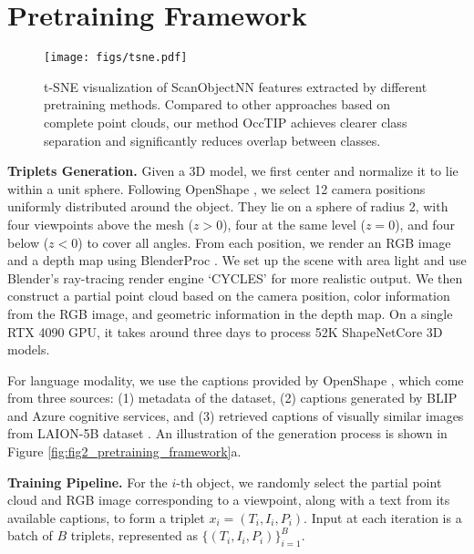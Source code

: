 \section{Pretraining Framework}
\label{sec:occtip}
\begin{figure*}[t]
    \centering
    \texttt{[image: figs/tsne.pdf]}
    \vspace{-7mm}
    \caption{t-SNE visualization of ScanObjectNN \cite{scanobjectnn} features extracted by different pretraining methods. Compared to other approaches based on complete point clouds, our method OccTIP achieves clearer class separation and significantly reduces overlap between classes.}
    \label{fig:tsne}
    \vspace{-5mm}
\end{figure*}
\vspace{1mm} \noindent\textbf{Triplets Generation.}
Given a 3D model, we first center and normalize it to lie within a unit sphere. Following OpenShape \cite{openshape}, we select 12 camera positions uniformly distributed around the object. They lie on a sphere of radius 2, with four viewpoints above the mesh ($z > 0$), four at the same level ($z = 0$), and four below ($z < 0$) to cover all angles. From each position, we render an RGB image and a depth map using BlenderProc \cite{blenderproc}. We set up the scene with area light and use Blender's ray-tracing render engine `CYCLES' for more realistic output. We then construct a partial point cloud based on the camera position, color information from the RGB image, and geometric information in the depth map. On a single RTX 4090 GPU, it takes around three days to process 52K ShapeNetCore \cite{shapenet} 3D models.

For language modality, we use the captions provided by OpenShape \cite{openshape}, which come from three sources: (1) metadata of the dataset, (2) captions generated by BLIP \cite{blip} and Azure cognitive services, and (3) retrieved captions of visually similar images from LAION-5B dataset \cite{laion_5b}. An illustration of the generation process is shown in Figure \ref{fig:fig2_pretraining_framework}a.

\vspace{1mm} 
\noindent\textbf{Training Pipeline.}
For the $i$-th object, we randomly select the partial point cloud and RGB image corresponding to a viewpoint, along with a text from its available captions, to form a triplet $x_i = (T_i, I_i, P_i)$. Input at each iteration is a batch of $B$ triplets, represented as $\{(T_i, I_i, P_i)\}_{i=1}^B$.

